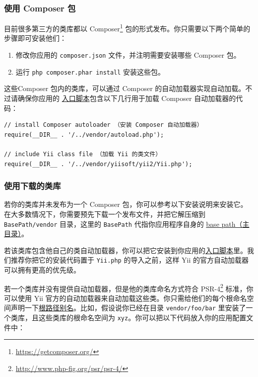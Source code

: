 \subsubsection{使用 Composer 包 \label{tutorial-yii-integration.md::using-composer-packages}}
目前很多第三方的类库都以 Composer\footnote{\url{https://getcomposer.org/}} 包的形式发布。你只需要以下两个简单的步骤即可安装他们：

\begin{enumerate}
\item 修改你应用的 \lstinline|composer.json| 文件，并注明需要安装哪些 Composer 包。
\item 运行 \lstinline|php composer.phar install| 安装这些包。
\end{enumerate}
这些Composer 包内的类库，可以通过 Composer 的自动加载器实现自动加载。不过请确保你应用的
\hyperref[structure-entry-scripts.md]{入口脚本}包含以下几行用于加载 Composer 自动加载器的代码：

\lstset{language=php}\begin{lstlisting}
// install Composer autoloader （安装 Composer 自动加载器）
require(__DIR__ . '/../vendor/autoload.php');

// include Yii class file （加载 Yii 的类文件）
require(__DIR__ . '/../vendor/yiisoft/yii2/Yii.php');
\end{lstlisting}
\subsubsection{使用下载的类库 \label{tutorial-yii-integration.md::using-downloaded-libs}}
若你的类库并未发布为一个 Composer 包，你可以参考以下安装说明来安装它。在大多数情况下，你需要预先下载一个发布文件，并把它解压缩到
\lstinline|BasePath/vendor| 目录，这里的 \lstinline|BasePath| 代指你应用程序自身的 \hyperref[structure-applications.md::basePath]{base path（主目录）}。

若该类库包含他自己的类自动加载器，你可以把它安装到你应用的\hyperref[structure-entry-scripts.md]{入口脚本}里。我们推荐你把它的安装代码置于
\lstinline|Yii.php| 的导入之前，这样 Yii 的官方自动加载器可以拥有更高的优先级。

若一个类库并没有提供自动加载器，但是他的类库命名方式符合 PSR-4\footnote{\url{http://www.php-fig.org/psr/psr-4/}} 标准，你可以使用 Yii 官方的自动加载器来自动加载这些类。你只需给他们的每个根命名空间声明一下\hyperref[concept-aliases.md::defining-aliases]{根路径别名}。比如，假设说你已经在目录 \lstinline|vendor/foo/bar| 里安装了一个类库，且这些类库的根命名空间为 \lstinline|xyz|。你可以把以下代码放入你的应用配置文件中：


